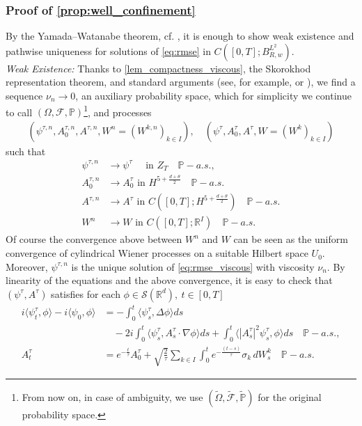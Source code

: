 \documentclass[a4paper,10pt]{amsart}
\newcommand{\R}{\mathbb{R}}
\theoremstyle{remark}
\numberwithin{equation}{section}
\begin{document}
\subsubsection{Proof of \cref{prop:well_confinement}}\label{subsec_well_posed_fast_slow}
By the Yamada--Watanabe theorem, cf. \cite{kurtzYW}, it is enough to show
weak existence and pathwise uniqueness for solutions of \eqref{eq:rmse} in
$C([0,T];B^{L^2}_{R,w})$.\\
\emph{Weak Existence: }
Thanks to \cref{lem_compactness_viscous}, the
Skorokhod representation theorem, and standard arguments (see, for example,
\cite[Chapter 2]{flandoli2023stochastic} or
\cite[Section 5.3]{brzezniak2013existence}), we find a sequence
$\nu_n\rightarrow0$,
an auxiliary probability space, which for simplicity we continue to call
$(\Omega,\mathcal{F},\mathbb{P})$\footnote{From now on, in case of ambiguity,
we use $(\tilde{\Omega},\tilde{\mathcal{F}},\tilde{\mathbb{P}})$ for the
original probability space.}, and processes
\begin{align*}
(\psi^{\tau,n},A^{\tau,n}_0,A^{\tau,n},
W^n=(W^{k,n})_{k\in I}),\quad (\psi^{\tau},A^{\tau}_0,A^{\tau},W=(W^{k})_{k\in I})
\end{align*}
such that
\begin{align*}
 \psi^{\tau,n}&\rightarrow \psi^{\tau}\quad\text{ in }Z_T\quad \mathbb{P}-a.s.,\\
 A^{\tau,n}_0&\rightarrow A^{\tau}_0 \text{ in }H^{5+\frac{d+\theta}{2}}\quad \mathbb{P}-a.s.\\
 A^{\tau,n}&\rightarrow A^{\tau} \text{ in }C([0,T];H^{5+\frac{d+\theta}{2}})\quad \mathbb{P}-a.s.\\
 W^n&\rightarrow W \text{ in }C([0,T];\R^I)\quad \mathbb{P}-a.s.
\end{align*}
Of course the convergence above between $W^n$ and $W$ can be seen as the uniform convergence of
cylindrical Wiener processes
on a suitable Hilbert space $U_0$. Moreover, $\psi^{\tau,n}$ is the unique solution of \eqref{eq:rmse_viscous} with viscosity $\nu_n$. By linearity of the equations and the above convergence, it is easy to check that $(\psi^\tau,A^{\tau})$ satisfies for each $\phi\in \mathscr{S}(\R^d),\ t\in [0,T]$ 
	   \begin{align*}
	       i\langle \psi^{\tau}_t,\phi\rangle-i\langle \psi_0,\phi\rangle
	       &=-\int_0^t \langle\psi^{\tau}_s,\Delta\phi\rangle ds\\
	       &\quad-2i\int_0^t
	       \langle \psi^{\tau}_s,A^{\tau}_s\cdot\nabla\phi\rangle ds
	       +\int_0^t \langle|A^{\tau}_s|^2\psi^\tau_s,\phi\rangle ds
	       \quad \mathbb{P}-a.s.,\\
	       A^{\tau}_t
	       &=e^{-\frac{t}{\tau}}A^{\tau}_0
	       +\sqrt{\frac{2}{{\tau}}}\sum_{k\in I}\int_{0}^t
	       e^{-\frac{(t-s)}{\tau}}\sigma_k\,dW^k_s
	       \quad \mathbb{P}-a.s.
   \end{align*}
\end{document}
